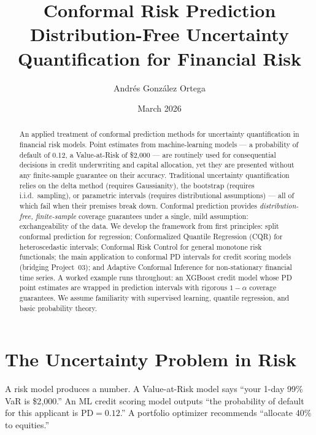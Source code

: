 \documentclass[11pt, a4paper]{article}
\title{%
    \textbf{Conformal Risk Prediction} \\[0.5em]
    \large Distribution-Free Uncertainty Quantification for Financial Risk
}
\author{Andr\'es Gonz\'alez Ortega}
\date{March 2026}
\theoremstyle{definition}
\theoremstyle{plain}
\theoremstyle{remark}
\begin{document}
\maketitle

\begin{abstract}
An applied treatment of conformal prediction methods for uncertainty quantification
in financial risk models.
Point estimates from machine-learning models --- a probability of default of 0.12,
a Value-at-Risk of \$2{,}000 --- are routinely used for consequential decisions
in credit underwriting and capital allocation, yet they are presented without any
finite-sample guarantee on their accuracy.
Traditional uncertainty quantification relies on the delta method (requires
Gaussianity), the bootstrap (requires i.i.d.\ sampling), or parametric intervals
(requires distributional assumptions) --- all of which fail when their premises
break down.
Conformal prediction provides \emph{distribution-free, finite-sample} coverage
guarantees under a single, mild assumption: exchangeability of the data.
We develop the framework from first principles: split conformal prediction for
regression; Conformalized Quantile Regression (CQR) for heteroscedastic intervals;
Conformal Risk Control for general monotone risk functionals; the main application
to conformal PD intervals for credit scoring models (bridging Project~03); and
Adaptive Conformal Inference for non-stationary financial time series.
A worked example runs throughout: an XGBoost credit model whose PD point estimates
are wrapped in prediction intervals with rigorous $1-\alpha$ coverage guarantees.
We assume familiarity with supervised learning, quantile regression, and basic
probability theory.
\end{abstract}

\tableofcontents
\newpage

\section{The Uncertainty Problem in Risk}
\label{sec:uncertainty-problem}

A risk model produces a number.
A Value-at-Risk model says ``your 1-day 99\% VaR is \$2{,}000.''
An ML credit scoring model outputs ``the probability of default for this applicant
is $\mathrm{PD} = 0.12$.''
A portfolio optimizer recommends ``allocate 40\% to equities.''
\end{document}
